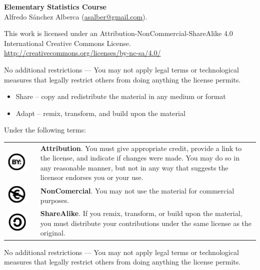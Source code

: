 \sffamily
\small
\noindent \textbf{Elementary Statistics Course}\\
Alfredo Sánchez Alberca (\url{asalber@gmail.com}).
\smallskip

\scriptsize
This work is licensed under an Attribution-NonCommercial-ShareAlike 4.0 International Creative Commons License. 
\url{http://creativecommons.org/licenses/by-nc-sa/4.0/}

\medskip

No additional restrictions — You may not apply legal terms or technological measures that legally restrict others from doing anything the license permits.

\begin{itemize}
\item Share -- copy and redistribute the material in any medium or format
\item Adapt -- remix, transform, and build upon the material
\end{itemize}

Under the following terms:
\begin{center}
\begin{tabular}{ccp{10cm}}
\includegraphics[scale=0.15]{img/cc-by} & \quad & \textbf{Attribution}. You must give appropriate credit, provide a link
to the license, and indicate if changes were made. You may do so in any reasonable manner, but not in any way that
suggests the licensor endorses you or your use.\\ 
\includegraphics[scale=0.15]{img/cc-e} & \quad & \textbf{NonComercial}. You may not use the material for commercial purposes.\\ 
\includegraphics[scale=0.15]{img/cc-c} & \quad & \textbf{ShareAlike}. If you remix, transform, or build upon the
material, you must distribute your contributions under the same license as the original. 
\end{tabular}
\end{center}

No additional restrictions — You may not apply legal terms or technological measures that legally restrict others from
doing anything the license permits.
